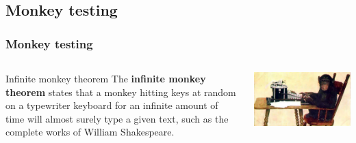\documentclass{beamer}
\begin{document}
\subsection{Monkey testing}
\begin{frame}
\frametitle{Monkey testing}
    \begin{columns}[c] %
\begin{block}{Infinite monkey theorem}
The \textbf{infinite monkey theorem} states that a monkey hitting keys at random
on a typewriter keyboard for an infinite amount of time will almost surely type a
given text, such as the complete works of William Shakespeare.\cite{monkey}
\end{block}
    \includegraphics[width=\textwidth]{../img/monkey_approach} 
    \end{columns}
\end{frame}
\end{document}
